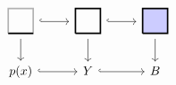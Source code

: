 \begin{center}
    \(
    \begin{tikzcd}
    \begin{tikzpicture}[x=2em, y=2em, baseline=0.7em]
        \draw[very thick, black!30] (0,0)--(1,0)--(1,1)--(0,1)--(0,0);
        \draw[very thick]
        (0,0)--(1,0);
    \end{tikzpicture}
    \ar[r, hook]\ar[d]
    & 
    \begin{tikzpicture}[x=2em, y=2em, baseline=0.7em]
        \draw[very thick] (0,0)--(1,0)--(1,1)--(0,1)--(0,0);
    \end{tikzpicture} 
    \ar[r, hook]\ar[d]
    &
    \begin{tikzpicture}[x=2em, y=2em, baseline=0.7em]
        \filldraw[very thick, fill=blue!20] (0,0)--(1,0)--(1,1)--(0,1)--(0,0);
    \end{tikzpicture}
    \ar[d]\\
    p(x)\ar[r, hook]&Y\ar[r, hook]&B
    \end{tikzcd}
    \)
\end{center}